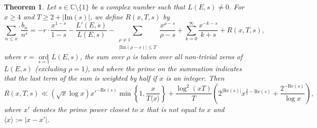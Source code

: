 \documentclass[12pt,reqno]{amsart}
\newtheorem{theorem}{Theorem}[section]
\theoremstyle{definition}
\numberwithin{equation}{section}
\renewcommand{\Im}{\mathrm{Im}}
\newcommand{\ord}{\mathop{\mathrm{ord}}}
\renewcommand{\Re}{\mathrm{Re}}
\begin{document}
\begin{theorem} \label{explicit}
Let $s \in \mathbb C \setminus{ \{1\}} $ be a complex number such that $L(E, s) \neq 0$. For $x \geq 4$ and $T \geq 2+ |\Im(s)|$, we define $R(x, T, s)$ by 
$$
\sum_{n \leq x} {}^{'} \frac{b_n}{n^s} = -r \cdot \frac{x^{1-s}}{1-s}-\frac{L'(E, s)}{L(E, s)}-\sum_{\substack{\rho \neq 1 \\ |\Im (\rho -s)| \leq T}}\frac{x^{\rho-s}}{\rho-s}+\sum_{k=0}^{\infty} \frac{x^{-k-s}}{k+s} + R(x, T, s), 
$$
where $r=\ord \limits _{s=1} L(E, s)$, the sum over $\rho$ is taken over all non-trivial zeros of $L(E, s)$ (excluding $\rho=1$), and where the prime on the summation indicates that the last term of the sum is weighted by half if $x$ is an integer.  Then 
$$
R(x, T, s) \ll (\sqrt x \log x)  x'^{-\Re(s)} \min \left \{ 1 , \frac{x}{T \langle x \rangle } \right \} + \frac{ \log^2(xT) }{T} \left(  2^{|\Re(s)| } x^{\frac{3}{2}-\Re(s)} + \frac{2^{-\Re(s) }}{\log x} \right), 
$$
where $x'$ denotes the prime power closest to $x$ that is not equal to $x$ and $\langle x \rangle :=|x-x'|$. 
\end{theorem}
\end{document}
